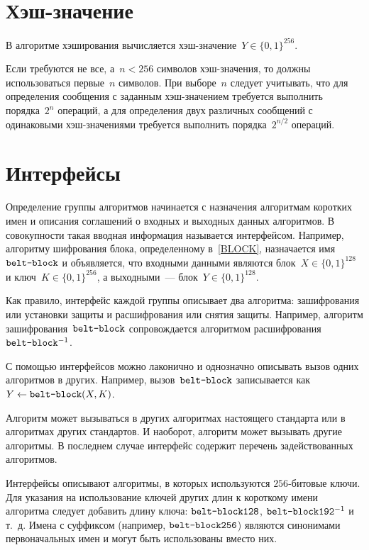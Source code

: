\section{Хэш-значение}

В алгоритме хэширования вычисляется хэш-значение~$Y\in\{0,1\}^{256}$.

Если требуются не все, а~$n<256$ символов хэш-значения, 
то должны использоваться первые~$n$ символов.
%
При выборе~$n$ следует учитывать, 
что для определения сообщения с заданным хэш-значением
требуется выполнить порядка~$2^n$ операций,
а для определения двух различных сообщений
с одинаковыми хэш-значениями требуется выполнить
порядка~$2^{n/2}$ операций.

\section{Интерфейсы}\label{COMMON.IFace}

Определение группы алгоритмов начинается с назначения алгоритмам коротких 
имен и описания соглашений о входных и выходных данных алгоритмов.
В совокупности такая вводная информация называется интерфейсом.
%
Например, алгоритму шифрования блока, определенному в~\ref{BLOCK},
назначается имя~$\texttt{belt-block}$ и объявляется, что входными 
данными являются блок~$X\in\{0,1\}^{128}$ и ключ~$K\in\{0,1\}^{256}$,
а выходными~--- блок~$Y\in\{0,1\}^{128}$.

Как правило, интерфейс каждой группы описывает два алгоритма: зашифрования 
или установки защиты и расшифрования или снятия защиты. Например, 
алгоритм зашифрования~$\texttt{belt-block}$ сопровождается 
алгоритмом расшифрования~$\texttt{belt-block}^{-1}$.

С помощью интерфейсов можно лаконично и однозначно 
описывать вызов одних алгоритмов в других.
%        	
Например, вызов~$\texttt{belt-block}$ 
записывается как~$Y\leftarrow\texttt{belt-block}(X,K)$.

Алгоритм может вызываться в других алгоритмах настоящего стандарта или 
в алгоритмах других стандартов. И наоборот, алгоритм может 
вызывать другие алгоритмы. В последнем случае интерфейс содержит перечень 
задействованных алгоритмов.

Интерфейсы описывают алгоритмы, в которых используются $256$-битовые 
ключи. Для указания на использование ключей других длин к короткому 
имени алгоритма следует добавить длину ключа:
$\texttt{belt-block128}$, $\texttt{belt-block192}^{-1}$ и т.~д.
%
Имена с суффиксом  (например, $\texttt{belt-block256}$) 
являются синонимами первоначальных имен и могут быть использованы вместо них.

